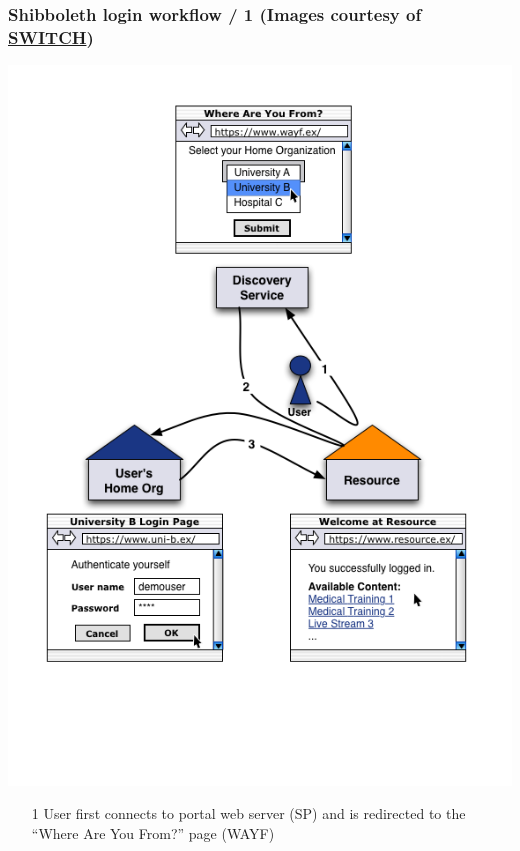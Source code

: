 \documentclass{beamer}
\newcommand{\+}{\vspace{1em}}
\begin{document}
\begin{frame}[label=more-shib]
  \frametitle{Shibboleth login workflow / 1
    \hfill%
    {\tiny (Images courtesy of 
      \href{http://www.switch.ch/aai/demo/2/medium.html}{SWITCH})}
  }
  \begin{center}
    \includegraphics[height=0.66\textheight]{simple_complete}
  \end{center}
  \begin{enumerate}
  \item[1] User first connects to portal web server (SP) and is
    redirected to the ``Where Are You From?'' page (WAYF)
  \end{enumerate}
\end{frame}
\end{document}
